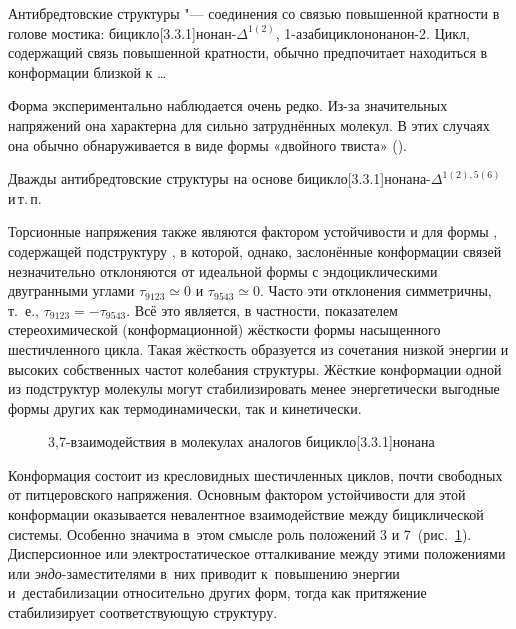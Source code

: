 Антибредтовские структуры "--- соединения со связью повышенной кратности в голове мостика: бицикло[3.3.1]нонан-$\Delta^{1(2)}$, 1-азабицикло\-[3.3.1]нонанон-2. Цикл, содержащий связь повышенной кратности, обычно предпочитает находиться в конформации близкой к \dots

\begin{center}
   \quad
   \quad 
\end{center}


Форма \BB{} экспериментально наблюдается очень редко. Из-за значительных напряжений она характерна для сильно затруднённых молекул. В этих случаях она обычно обнаруживается в виде формы «двойного твиста» (\TT{}).

Дважды антибредтовские структуры на основе бицикло[3.3.1]нонана-$\Delta^{1(2),5(6)}$  и\,т.\,п.

\begin{center}
   \quad
   \quad {}
\end{center}

Торсионные напряжения также являются фактором устойчивости и для формы \CB{}, содержащей подструктуру , в которой, однако, заслонённые конформации связей незначительно отклоняются от идеальной формы  с эндоциклическими двугранными углами $\tau_{9123}\simeq 0$ и $\tau_{9543}\simeq 0$. Часто эти отклонения симметричны, т. е., $\tau_{9123} = - \tau_{9543}$. Всё это является, в частности, показателем стереохимической (конформационной) жёсткости формы  насыщенного шестичленного цикла. Такая жёсткость образуется из сочетания низкой энергии и высоких собственных частот колебания структуры. Жёсткие конформации одной из подструктур молекулы могут стабилизировать менее энергетически выгодные формы других как термодинамически, так и кинетически.

\begin{figure}
\centerfloat{
}
\caption{\label{fig:Interactions:37}3,7-взаимодействия в молекулах аналогов бицикло[3.3.1]нонана}
\end{figure}

Конформация \CC{} состоит из кресловидных шестичленных циклов, почти свободных от питцеровского напряжения. Основным фактором устойчивости для этой конформации оказывается невалентное взаимодействие между  бициклической системы. Особенно значима в~этом смысле роль положений 3 и 7~(рис.~\ref{fig:Interactions:37}). Дисперсионное или электростатическое отталкивание между этими положениями или \emph{эндо}-заместителями в~них приводит к~повышению энергии и~дестабилизации \CC{} относительно других форм, тогда как притяжение стабилизирует соответствующую структуру.

